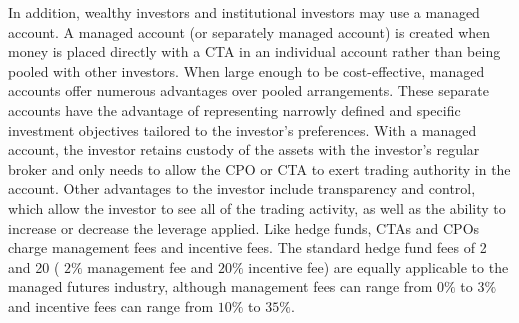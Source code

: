 \documentclass[11pt]{article}
\begin{document}
In addition, wealthy investors and institutional investors may use a managed account. A managed account (or separately managed account) is created when money is placed directly with a CTA in an individual account rather than being pooled with other investors. When large enough to be cost-effective, managed accounts offer numerous advantages over pooled arrangements. These separate accounts have the advantage of representing narrowly defined and specific investment objectives tailored to the investor's preferences. With a managed account, the investor retains custody of the assets with the investor's regular broker and only needs to allow the CPO or CTA to exert trading authority in the account. Other advantages to the investor include transparency and control, which allow the investor to see all of the trading activity, as well as the ability to increase or decrease the leverage applied. Like hedge funds, CTAs and CPOs charge management fees and incentive fees. The standard hedge fund fees of 2 and 20 ( $2 \%$ management fee and $20 \%$ incentive fee) are equally applicable to the managed futures industry, although management fees can range from $0 \%$ to $3 \%$ and incentive fees can range from $10 \%$ to $35 \%$.
\end{document}
